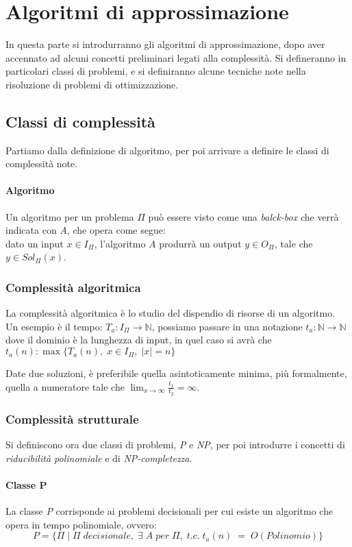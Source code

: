 \section{Algoritmi di approssimazione}
In questa parte si introdurranno gli algoritmi di approssimazione, 
dopo aver accennato ad alcuni concetti preliminari legati alla complessità.
Si defineranno in particolari classi di problemi, e si definiranno alcune 
tecniche note nella risoluzione di problemi di ottimizzazione.

\subsection{Classi di complessità}
Partiamo dalla definizione di algoritmo, per poi arrivare a definire le classi
di complessità note.

\paragraph{Algoritmo}
Un algoritmo per un problema $\Pi$ può essere visto come una \emph{balck-box}
che verrà indicata con $A$, che opera come segue: \\
dato un input $x \in I_{\Pi}$, l'algoritmo $A$ produrrà un output 
$y \in O_{\Pi}$, tale che $y \in Sol_{\Pi}(x)$.

\subsubsection{Complessità algoritmica}
La complessità algoritmica è lo studio del dispendio di risorse di 
un algoritmo.\\
Un esempio è il tempo: $T_a : I_\Pi \rightarrow \mathbb{N}$, possiamo passare
in una notazione $t_a : \mathbb{N} \rightarrow \mathbb{N}$ dove il dominio è 
la lunghezza di input, in quel caso si avrà che $t_a(n) : \max\{ T_a(n),\; x \in I_{\Pi},\; |x| = n\}$

Date due soluzioni, è preferibile quella asintoticamente minima, 
più formalmente, quella a numeratore tale che $\lim_{x \to \infty} \frac{t_1}{t_2} = \infty $.

\subsubsection{Complessità strutturale}
Si definiscono ora due classi di problemi, \emph{P} e \emph{NP}, per 
poi introdurre i concetti di \emph{riducibilità polinomiale} e di \emph{NP-completezza}.

\paragraph{Classe P}
La classe \emph{P} corrisponde ai problemi decisionali 
per cui esiste un algoritmo che opera
in tempo polinomiale, ovvero: 
$$P = \{\Pi\;|\;\Pi\;decisionale, \; \exists\;A\;per\;\Pi,\;t.c.\;t_a(n)\;=\;O(Polinomio)\}$$

